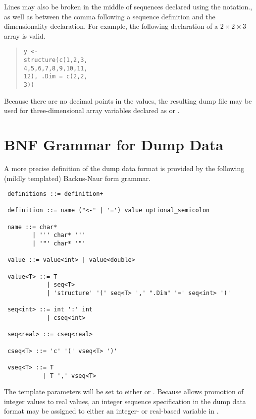 Lines may also be broken in the middle of sequences declared
using the  notation., as well as between the comma
following a sequence definition and the dimensionality declaration.
For example, the following declaration of a $2 \times 2 \times 3$
array is valid.
%
\begin{quote}
\begin{Verbatim}
y <-
structure(c(1,2,3,
4,5,6,7,8,9,10,11,
12), .Dim = c(2,2,
3))
\end{Verbatim}
\end{quote}
%
Because there are no decimal points in the values, the resulting dump
file may be used for three-dimensional array variables declared as
 or .

\section{BNF Grammar for Dump Data}

A more precise definition of the dump data format is provided
by the following (mildly templated) Backus-Naur form grammar.

{\small 
\begin{verbatim}
 definitions ::= definition+

 definition ::= name ("<-" | '=') value optional_semicolon

 name ::= char* 
        | ''' char* ''' 
        | '"' char* '"'

 value ::= value<int> | value<double>

 value<T> ::= T 
            | seq<T>
            | 'structure' '(' seq<T> ',' ".Dim" '=' seq<int> ')'

 seq<int> ::= int ':' int
            | cseq<int>

 seq<real> ::= cseq<real>

 cseq<T> ::= 'c' '(' vseq<T> ')'

 vseq<T> ::= T
           | T ',' vseq<T>
\end{verbatim}
}
\noindent
The template parameters  will be set to either  or
.  Because \Stan allows promotion of integer values to real
values, an integer sequence specification in the dump data format may
be assigned to either an integer- or real-based variable in \Stan.











